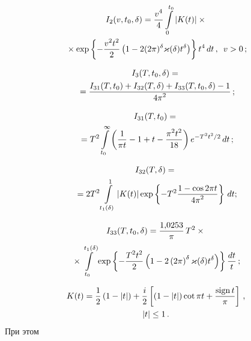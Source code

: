 \begin{multicols}{2}
\vspace*{-12pt}

\noindent
\begin{multline*}
I_2(v,t_0,\delta)= \fr{v^4}4\int\limits_0^{t_0}\left|K(t)\right|\times{}\\
{}\times
\exp\left\{-\fr{v^2t^2}2 \left(1-2(2\pi)^\delta\varkappa(\delta)t^{\delta}
\right)\right\} t^4\, dt\,,\enskip v>0\,;
\end{multline*}

\vspace*{-12pt}

\noindent
\begin{multline*}
I_3(T,t_0,\delta)={}\\
{}= \fr{I_{31}(T,t_0)+
I_{32}(T,\delta)+I_{33}(T,t_0,\delta)-1}{4\pi^2}\,;
\end{multline*}

\vspace*{-12pt}

\noindent
\begin{multline*}
I_{31}(T,t_0)={}\\
{}=
T^2\int\limits_{t_0}^{\infty}{\left(\fr{1}{\pi t}
-1+t-\fr{\pi^2t^2}{18}\right)e^{-T^2t^2/2}\,dt}\,;
\end{multline*}

\vspace*{-12pt}

\noindent
\begin{multline*}
I_{32}(T,\delta)={}\\
{}=
2T^2\int\limits_{t_1(\delta)}^1\left|K(t)\right|
\exp\left\{-T^2\fr{1-\cos 2\pi t}{4\pi^2}\right\} \,dt;
\end{multline*}

\vspace*{-12pt}

\noindent
\begin{multline*}
I_{33}(T,t_0,\delta)=\fr{1{,}0253}{\pi}\, T^2\times{}\\
{}\times
\int\limits_{t_0}^{t_1(\delta)}
\exp\left\{-\fr{T^2t^2}{2}\left(1-
2\left(2\pi\right)^\delta \varkappa(\delta)t^\delta \right)\right\}
\fr{dt}t\,;
\end{multline*}

\vspace*{-12pt}

\noindent
\begin{multline*}
K(t)=\fr{1}{2}\left(1-|t|\right)+\fr{i}{2}\left[(1-|t|)\cot \pi t+ \fr{\mathrm{sign}\,
t}\pi\right]\,,\\ |t|\le1\,.
\end{multline*}
При этом


\end{multicols}

